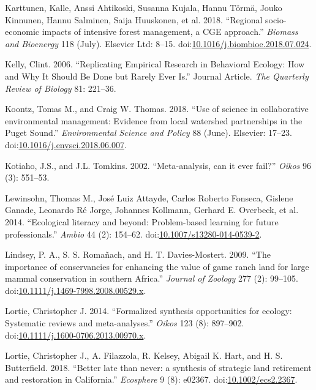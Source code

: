 \documentclass[fleqn,10pt]{wlpeerj} %
\begin{document}
\hypertarget{ref-Karttunen2018}{}
Karttunen, Kalle, Anssi Ahtikoski, Susanna Kujala, Hannu Törmä, Jouko
Kinnunen, Hannu Salminen, Saija Huuskonen, et al. 2018. ``Regional
socio-economic impacts of intensive forest management, a CGE approach.''
\emph{Biomass and Bioenergy} 118 (July). Elsevier Ltd: 8--15.
doi:\href{https://doi.org/10.1016/j.biombioe.2018.07.024}{10.1016/j.biombioe.2018.07.024}.

\hypertarget{ref-Kelly2006}{}
Kelly, Clint. 2006. ``Replicating Empirical Research in Behavioral
Ecology: How and Why It Should Be Done but Rarely Ever Is.'' Journal
Article. \emph{The Quarterly Review of Biology} 81: 221--36.

\hypertarget{ref-Koontz2018}{}
Koontz, Tomas M., and Craig W. Thomas. 2018. ``Use of science in
collaborative environmental management: Evidence from local watershed
partnerships in the Puget Sound.'' \emph{Environmental Science and
Policy} 88 (June). Elsevier: 17--23.
doi:\href{https://doi.org/10.1016/j.envsci.2018.06.007}{10.1016/j.envsci.2018.06.007}.

\hypertarget{ref-Kotiaho2002}{}
Kotiaho, J.S., and J.L. Tomkins. 2002. ``Meta-analysis, can it ever
fail?'' \emph{Oikos} 96 (3): 551--53.

\hypertarget{ref-Lewinsohn2014}{}
Lewinsohn, Thomas M., José Luiz Attayde, Carlos Roberto Fonseca, Gislene
Ganade, Leonardo Ré Jorge, Johannes Kollmann, Gerhard E. Overbeck, et
al. 2014. ``Ecological literacy and beyond: Problem-based learning for
future professionals.'' \emph{Ambio} 44 (2): 154--62.
doi:\href{https://doi.org/10.1007/s13280-014-0539-2}{10.1007/s13280-014-0539-2}.

\hypertarget{ref-Lindsey2009}{}
Lindsey, P. A., S. S. Romañach, and H. T. Davies-Mostert. 2009. ``The
importance of conservancies for enhancing the value of game ranch land
for large mammal conservation in southern Africa.'' \emph{Journal of
Zoology} 277 (2): 99--105.
doi:\href{https://doi.org/10.1111/j.1469-7998.2008.00529.x}{10.1111/j.1469-7998.2008.00529.x}.

\hypertarget{ref-Lortie2014}{}
Lortie, Christopher J. 2014. ``Formalized synthesis opportunities for
ecology: Systematic reviews and meta-analyses.'' \emph{Oikos} 123 (8):
897--902.
doi:\href{https://doi.org/10.1111/j.1600-0706.2013.00970.x}{10.1111/j.1600-0706.2013.00970.x}.

\hypertarget{ref-Lortie2018}{}
Lortie, Christopher J., A. Filazzola, R. Kelsey, Abigail K. Hart, and H.
S. Butterfield. 2018. ``Better late than never: a synthesis of strategic
land retirement and restoration in California.'' \emph{Ecosphere} 9 (8):
e02367. doi:\href{https://doi.org/10.1002/ecs2.2367}{10.1002/ecs2.2367}.
\end{document}
